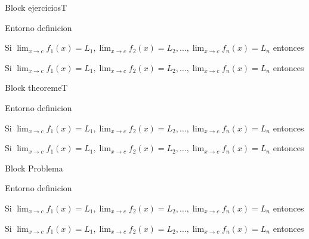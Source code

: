 \documentclass[]{beamer}
\theoremstyle{plain}
\begin{document}
\begin{frame}[fragile]{Block ejerciciosT}
\begin{source}{Entorno definicion}{}
\begin{ejerciciosT}
 Si \hspace{5pt}$\displaystyle \lim_{x\rightarrow c}f_1(x)=L_1, \displaystyle \lim_{x\rightarrow c}f_2(x)=L_2,\dots, \displaystyle \lim_{x\rightarrow c}f_n(x)=L_n $
 entonces
\end{ejerciciosT}
\end{source}
\begin{ejerciciosT}
 Si \hspace{5pt}$\displaystyle \lim_{x\rightarrow c}f_1(x)=L_1, \displaystyle \lim_{x\rightarrow c}f_2(x)=L_2,\dots, \displaystyle \lim_{x\rightarrow c}f_n(x)=L_n $
 entonces
\end{ejerciciosT}
\end{frame}
\begin{frame}[fragile]{Block theoremeT}
\begin{source}{Entorno definicion}{}
\begin{theoremeT}
 Si \hspace{5pt}$\displaystyle \lim_{x\rightarrow c}f_1(x)=L_1, \displaystyle \lim_{x\rightarrow c}f_2(x)=L_2,\dots, \displaystyle \lim_{x\rightarrow c}f_n(x)=L_n $
 entonces
\end{theoremeT}
\end{source}
\begin{theoremeT}
 Si \hspace{5pt}$\displaystyle \lim_{x\rightarrow c}f_1(x)=L_1, \displaystyle \lim_{x\rightarrow c}f_2(x)=L_2,\dots, \displaystyle \lim_{x\rightarrow c}f_n(x)=L_n $
 entonces
\end{theoremeT}
\end{frame}
\begin{frame}[fragile]{Block Problema}
\begin{source}{Entorno definicion}{}
\begin{problema}
 Si \hspace{5pt}$\displaystyle \lim_{x\rightarrow c}f_1(x)=L_1, \displaystyle \lim_{x\rightarrow c}f_2(x)=L_2,\dots, \displaystyle \lim_{x\rightarrow c}f_n(x)=L_n $
 entonces
\end{problema}
\end{source}
\begin{problema}
 Si \hspace{5pt}$\displaystyle \lim_{x\rightarrow c}f_1(x)=L_1, \displaystyle \lim_{x\rightarrow c}f_2(x)=L_2,\dots, \displaystyle \lim_{x\rightarrow c}f_n(x)=L_n $
 entonces
\end{problema}
\end{frame}
\end{document}
